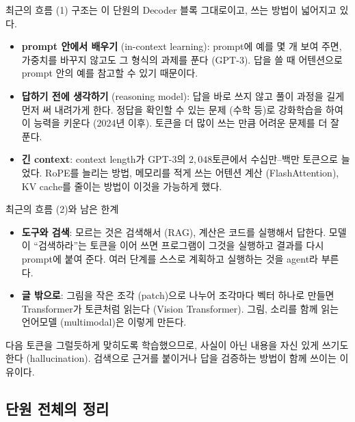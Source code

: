 \documentclass[aspectratio=169,11pt]{beamer}
\begin{document}
\begin{frame}{최근의 흐름 (1)}
구조는 이 단원의 Decoder 블록 그대로이고, 쓰는 방법이 넓어지고 있다.
\begin{itemize}
\item \textbf{prompt 안에서 배우기} (in-context learning): prompt에 예를 몇 개 보여 주면,
  가중치를 바꾸지 않고도 그 형식의 과제를 푼다 (GPT-3).
  답을 쓸 때 어텐션으로 prompt 안의 예를 참고할 수 있기 때문이다.
\item \textbf{답하기 전에 생각하기} (reasoning model): 답을 바로 쓰지 않고 풀이 과정을 길게
  먼저 써 내려가게 한다. 정답을 확인할 수 있는 문제 (수학 등)로 강화학습을 하여 이 능력을
  키운다 (2024년 이후). 토큰을 더 많이 쓰는 만큼 어려운 문제를 더 잘 푼다.
\item \textbf{긴 context}: context length가 GPT-3의 $2{,}048$토큰에서 수십만--백만 토큰으로 늘었다.
  RoPE를 늘리는 방법, 메모리를 적게 쓰는 어텐션 계산 (FlashAttention),
  KV cache를 줄이는 방법이 이것을 가능하게 했다.
\end{itemize}
\end{frame}

\begin{frame}{최근의 흐름 (2)와 남은 한계}
\begin{itemize}
\item \textbf{도구와 검색}: 모르는 것은 검색해서 (RAG), 계산은 코드를 실행해서 답한다.
  모델이 ``검색하라''는 토큰을 이어 쓰면 프로그램이 그것을 실행하고 결과를 다시 prompt에 붙여 준다.
  여러 단계를 스스로 계획하고 실행하는 것을 agent라 부른다.
\item \textbf{글 밖으로}: 그림을 작은 조각 (patch)으로 나누어 조각마다 벡터 하나로 만들면
  Transformer가 토큰처럼 읽는다 (Vision Transformer).
  그림, 소리를 함께 읽는 언어모델 (multimodal)은 이렇게 만든다.
\end{itemize}
\vskip2mm
\begin{thinkbox}[남은 한계]
다음 토큰을 그럴듯하게 맞히도록 학습했으므로, 사실이 아닌 내용을 자신 있게 쓰기도 한다
(hallucination). 검색으로 근거를 붙이거나 답을 검증하는 방법이 함께 쓰이는 이유이다.
\end{thinkbox}
\end{frame}

\subsection{단원 전체의 정리}
\end{document}

